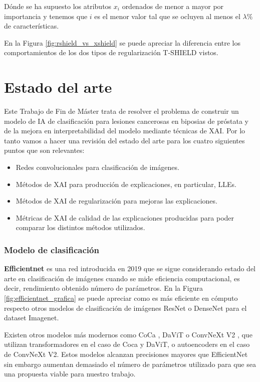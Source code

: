 Dónde se ha supuesto los atributos $x_i$ ordenados de menor a mayor por importancia y tenemos que $i$ es el menor valor tal que se ocluyen al menos el $\lambda \%$ de características.



En la Figura \ref{fig:rshield_vs_xshield} se puede apreciar la diferencia entre los comportamientos de los dos tipos de regularización T-SHIELD vistos.




\newpage
\chapter{Estado del arte} \label{cap:eda}
Este Trabajo de Fin de Máster trata de resolver el problema de construir un modelo de IA de clasificación para lesiones cancerosas en biposias de próstata y de la mejora en interpretabilidad del modelo mediante técnicas de XAI. Por lo tanto vamos a hacer una revisión del estado del arte para los cuatro siguientes puntos que son relevantes:


\begin{itemize}
\item Redes convolucionales para clasificación de imágenes.
\item Métodos de XAI para producción de explicaciones, en particular, LLEs.
\item Métodos de XAI de regularización para mejoras las explicaciones.
\item Métricas de XAI de calidad de las explicaciones producidas para poder comparar los distintos métodos utilizados.
\end{itemize}

\subsection*{Modelo de clasificación}

\textbf{Efficientnet} \cite{efficientnet2019} es una red introducida en 2019 que se sigue considerando estado del arte en clasificación de imágenes cuando se mide eficiencia computacional, es decir, rendimiento obtenido número de parámetros. En la Figura \ref{fig:efficientnet_grafica} se puede apreciar como es más eficiente en cómputo respecto otros modelos de clasificación de imágenes ResNet \cite{resnet} o DenseNet \cite{densenet} para el dataset Imagenet. 

Existen otros modelos más modernos como CoCa \cite{coca}, DaViT \cite{DaViT} o ConvNeXt V2 \cite{ConvNext}, que utilizan transformadores en el caso de Coca y DaViT, o autoencoders en el caso de ConvNeXt V2. Estos modelos alcanzan precisiones mayores que EfficientNet sin embargo aumentan demasiado el número de parámetros utilizado para que sea una propuesta viable para nuestro trabajo.

